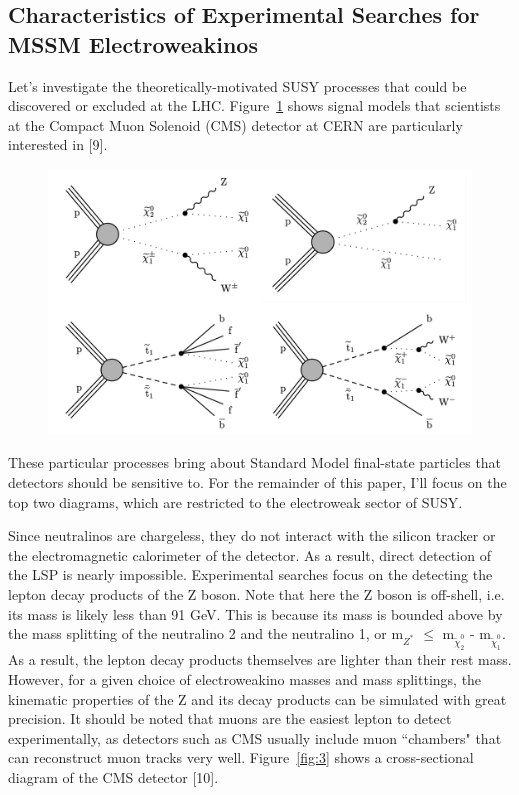 \documentclass{article}
\begin{document}
\subsection{Characteristics of Experimental Searches for MSSM Electroweakinos}
Let's investigate the theoretically-motivated SUSY processes that could be discovered or excluded at the LHC. Figure~\ref{fig:2} shows signal models that scientists at the Compact Muon Solenoid (CMS) detector at CERN are particularly interested in [9].
\begin{figure}[H]
    \centering
    \caption{} 
    \includegraphics[width=12cm]{FeynmanDiagrams.png}
    \label{fig:2}
\end{figure}
\par
These particular processes bring about Standard Model final-state particles that detectors should be sensitive to. For the remainder of this paper, I'll focus on the top two diagrams, which are restricted to the electroweak sector of SUSY.
\par
Since neutralinos are chargeless, they do not interact with the silicon tracker or the electromagnetic calorimeter of the detector. As a result, direct detection of the LSP is nearly impossible. Experimental searches focus on the detecting the lepton decay products of the Z boson. Note that here the Z boson is off-shell, i.e. its mass is likely less than 91 GeV. This is because its mass is bounded above by the mass splitting of the neutralino 2 and the neutralino 1, or m$_{Z^{*}}$ $\leq$ m$_{\tilde\chi_{2}^{0}}$ - m$_{\tilde\chi_{1}^{0}}$. As a result, the lepton decay products themselves are lighter than their rest mass. However, for a given choice of electroweakino masses and mass splittings, the kinematic properties of the Z and its decay products can be simulated with great precision. It should be noted that muons are the easiest lepton to detect experimentally, as detectors such as CMS usually include muon ``chambers"  that can reconstruct muon tracks very well. Figure~\ref{fig:3} shows a cross-sectional diagram of the CMS detector [10].
\end{document}
